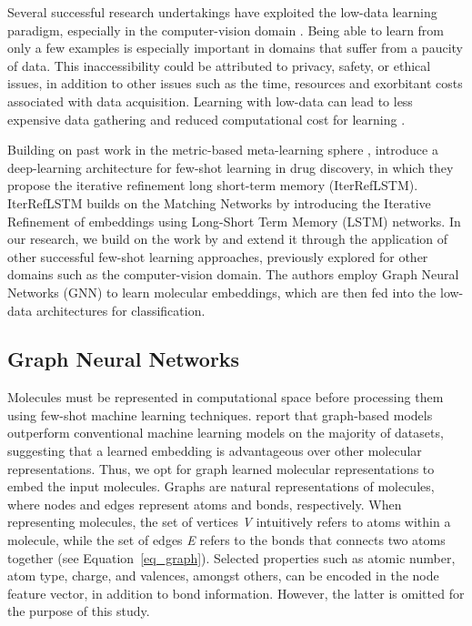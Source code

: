 Several successful research undertakings have exploited the low-data learning paradigm, especially in the computer-vision domain \cite{koch2015siamese, vinyals2016matching, snell2017prototypical, sung2018learning}. Being able to learn from only a few examples is especially important in domains that suffer from a paucity of data. This inaccessibility could be attributed to privacy, safety, or ethical issues, in addition to other issues such as the time, resources and exorbitant costs associated with data acquisition. Learning with low-data can lead to less expensive data gathering and reduced computational cost for learning \cite{wang2020generalizing}.

Building on past work in the metric-based meta-learning sphere \cite{vinyals2016matching}, \citet{altae2017low} introduce a deep-learning architecture for few-shot learning in drug discovery, in which they propose the iterative refinement long short-term memory (IterRefLSTM). IterRefLSTM builds on the Matching Networks \cite{vinyals2016matching} by introducing the Iterative Refinement of embeddings using Long-Short Term Memory (LSTM) networks. In our research, we build on the work by \citep{altae2017low} and extend it through the application of other successful few-shot learning approaches, previously explored for other domains such as the computer-vision domain. The authors employ Graph Neural Networks (GNN) to learn molecular embeddings, which are then fed into the low-data architectures for classification.

\subsection{Graph Neural Networks}

Molecules must be represented in computational space before processing them using few-shot machine learning techniques. \citet{wu2018moleculenet} report that graph-based models outperform conventional machine learning models on the majority of datasets, suggesting that a learned embedding is advantageous over other molecular representations. Thus, we opt for graph learned molecular representations to embed the input molecules. Graphs are natural representations of molecules, where nodes and edges represent atoms and bonds, respectively. When representing molecules, the set of vertices \textit{V} intuitively refers to atoms within a molecule, while the set of edges \textit{E} refers to the bonds that connects two atoms together (see Equation~\ref{eq_graph}). Selected properties such as atomic number, atom type, charge, and valences, amongst others, can be encoded in the node feature vector, in addition to bond information. However, the latter is omitted for the purpose of this study.

